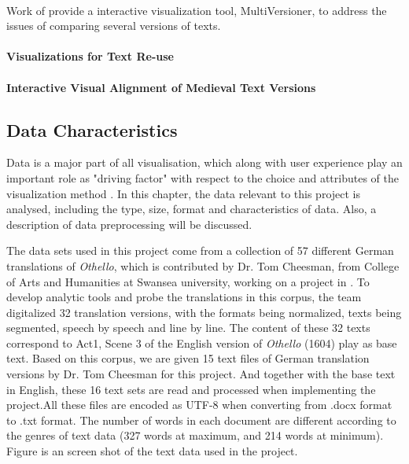 \paragraph[]{}Work of \cite{Jong2008} provide a interactive visualization tool, MultiVersioner, to address the issues of comparing several versions of texts.

\paragraph{Visualizations for Text Re-use}

\paragraph[]{}

\paragraph{Interactive Visual Alignment of Medieval Text Versions}

\paragraph[]{}


\subsection{Data Characteristics}

Data is a major part of all visualisation, which along with user experience play an important role as "driving factor" with respect to the choice and attributes of the visualization method \cite{Laramee}. In this chapter, the data relevant to this project is analysed, including the type, size, format and characteristics of data. Also, a description of data preprocessing will be discussed. 

The data sets used in this project come from a collection of 57 different German translations of \emph{Othello}, which is contributed by Dr. Tom Cheesman, from College of Arts and Humanities at Swansea university, working on a project in \cite{Tom2012}. To develop analytic tools and probe the translations in this corpus, the team digitalized 32 translation versions, with the formats being normalized, texts being segmented, speech by speech and line by line. The content of these 32 texts correspond to Act1, Scene 3 of the English version of \emph{Othello} (1604) play as base text. Based on this corpus, we are given 15 text files of German translation versions by Dr. Tom Cheesman for this project. And together with the base text in English, these 16 text sets are read and processed when implementing the project.All these files are encoded as UTF-8 when converting from .docx format to .txt format. The number of words in each document are different according to the genres of text data (327 words at maximum, and 214 words at minimum). Figure \label{dataExample} is an screen shot of the text data used in the project.

